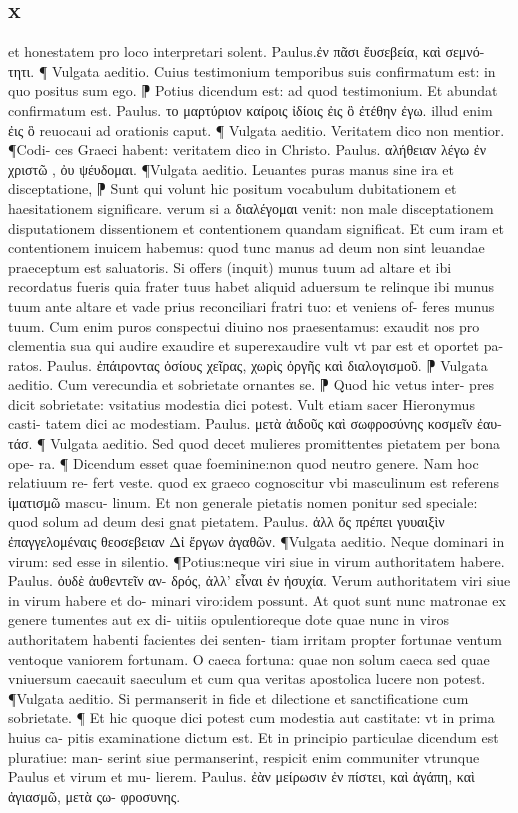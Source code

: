\documentclass{article}
\begin{document}
\begin{pages}
\section*{x }
\marginpar{[ p.204 ]}\pstart et honestatem pro loco interpretari solent. Paulus.ἐν πᾶσι ἔυσεβεία, καὶ σεμνό-  τητι. ¶ Vulgata aeditio. Cuius testimonium temporibus suis confirmatum est: in quo  positus sum ego. ⁋ Potius dicendum est: ad quod testimonium. Et abundat confirmatum est. Paulus. το μαρτύριον καίροις ἰδίοις ἐις ὃ ἐτέθην ἐγω. illud enim ἐις ὃ  reuocaui ad orationis caput. ¶ Vulgata aeditio. Veritatem dico non mentior. ¶Codi- ces Graeci habent: veritatem dico in Christo. Paulus. αλήθειαν λέγω ἐν χριστῶ , ὀυ ψέυδομαι. ¶Vulgata aeditio. Leuantes puras manus sine ira et disceptatione, ⁋ Sunt qui volunt hic positum vocabulum dubitationem et haesitationem significare. verum si a διαλέγομαι venit: non male disceptationem disputationem dissentionem et contentionem quandam significat. Et cum iram et contentionem inuicem habemus: quod tunc manus ad deum non sint leuandae praeceptum est saluatoris. Si offers (inquit) munus tuum ad altare et ibi recordatus fueris quia frater tuus habet aliquid aduersum te relinque ibi munus tuum ante altare et vade prius reconciliari fratri tuo: et veniens of- feres munus tuum. Cum enim puros conspectui diuino nos praesentamus: exaudit nos pro clementia sua qui audire exaudire et superexaudire vult vt par est et oportet pa- ratos. Paulus. ἐπάιροντας ὁσίους χεῖρας, χωρὶς ὀργῆς καὶ διαλογισμοῦ. ⁋ Vulgata aeditio. Cum verecundia et sobrietate ornantes se. ⁋ Quod hic vetus inter- pres dicit sobrietate: vsitatius modestia dici potest. Vult etiam sacer Hieronymus casti- tatem dici ac modestiam. Paulus. μετὰ ἀιδοῦς καὶ σωφροσύνης κοσμεῖν ἐαυ-  τάσ. ¶ Vulgata aeditio. Sed quod decet mulieres promittentes pietatem per bona ope- ra. ¶ Dicendum esset quae foeminine:non quod neutro genere. Nam hoc relatiuum re- fert veste. quod ex graeco cognoscitur vbi masculinum est referens ἱματισμῶ mascu- linum. Et non generale pietatis nomen ponitur sed speciale: quod solum ad deum desi gnat pietatem. Paulus. ἀλλ ὅς πρέπει γυυαιξὶν ἐπαγγελομέναις θεοσεβειαν  Δἰ ἔργων ἀγαθῶν. ¶Vulgata aeditio. Neque dominari in virum: sed esse in silentio. ¶Potius:neque viri siue in virum authoritatem habere. Paulus. ὀυδὲ ἀυθεντεῖν αν- δρός, ἀλλ’ εἶναι ἐν ἠσυχία. Verum authoritatem viri siue in virum habere et do- minari viro:idem possunt. At quot sunt nunc matronae ex genere tumentes aut ex di- uitiis opulentioreque dote quae nunc in viros authoritatem habenti facientes dei senten- tiam irritam propter fortunae ventum ventoque vaniorem fortunam. O caeca fortuna: quae non solum caeca sed quae vniuersum caecauit saeculum et cum qua veritas apostolica lucere  non potest. ¶Vulgata aeditio. Si permanserit in fide et dilectione et sanctificatione cum  sobrietate. ¶ Et hic quoque dici potest cum modestia aut castitate: vt in prima huius ca- pitis examinatione dictum est. Et in principio particulae dicendum est pluratiue: man- serint siue permanserint, respicit enim communiter vtrunque Paulus et virum et mu- lierem. Paulus. ἐὰν μείρωσιν ἐν πίστει, καὶ ἀγάπη, καὶ ἀγιασμῶ, μετὰ ςω- φροσυνης.  \pend

\end{pages}
\end{document}

